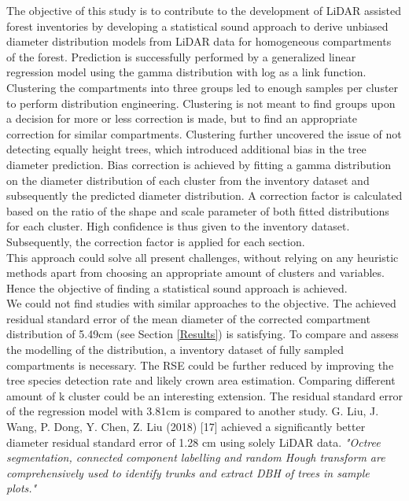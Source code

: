 
The objective of this study is to contribute to the development of LiDAR assisted forest inventories by developing
a statistical sound approach to derive unbiased diameter distribution models from LiDAR data for homogeneous
compartments of the forest. Prediction is successfully performed by a generalized linear
regression model using the gamma distribution with log as a link function. Clustering the compartments into three groups led to enough samples per cluster to
perform distribution engineering. Clustering is not meant to find groups upon a decision for more or less correction is made, but
to find an appropriate correction for similar compartments. Clustering further uncovered the issue of not detecting
equally height trees, which introduced additional bias in the tree diameter prediction. Bias correction is
achieved by fitting a gamma distribution on the diameter distribution of each cluster from the inventory dataset
and subsequently the predicted diameter distribution. A correction factor is calculated based on the ratio of the
shape and scale parameter of both fitted distributions for each cluster. High confidence is thus given to the
inventory dataset. Subsequently, the correction factor is applied for each section. \\

This approach could solve all present challenges, without relying on any heuristic methods apart from choosing
an appropriate amount of clusters and variables. Hence the objective of finding a statistical sound approach is achieved.\\

We could not find studies with similar approaches to the objective. 
The achieved residual standard error of the mean diameter of the corrected compartment distribution of 5.49cm (see Section \ref{Results}) is satisfying.
To compare and assess the modelling of the distribution, a inventory dataset of fully sampled compartments is necessary. 
The RSE could be further reduced by improving the tree species detection rate and likely crown area estimation. Comparing different amount of k cluster could be an interesting extension. 
The residual standard error of the regression model with 3.81cm is compared to another study. G. Liu, J. Wang, P. Dong, Y. Chen, Z. Liu (2018) [17] achieved a significantly better diameter residual standard error of 1.28 cm using solely LiDAR data. \textit{"Octree segmentation, connected component labelling and random Hough transform are comprehensively used to identify trunks and extract DBH of trees in sample plots."} \\

